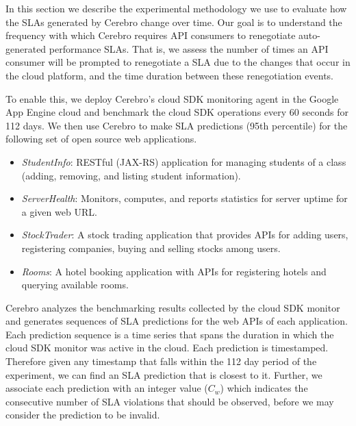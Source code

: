 In this section we describe the experimental methodology we use to evaluate how the SLAs
generated by Cerebro change over time. Our goal is to understand the frequency with
which Cerebro requires API consumers to renegotiate auto-generated performance SLAs. That is,
we assess the number of times an API consumer will be prompted to renegotiate a
SLA due to the changes that occur in the cloud platform, and the time duration
between these renegotiation events.

To enable this, we deploy Cerebro's cloud 
SDK monitoring agent in the Google App Engine cloud and benchmark
the cloud SDK operations every 60 seconds for 112 days. We then use Cerebro
to make SLA predictions (95th percentile) for the following set of open source web applications. 

\begin{itemize}
\vspace{-0.05in}
\item \textit{StudentInfo}: RESTful (JAX-RS) application for managing
students of a class (adding, removing, and listing student information).
\vspace{-0.05in}
\item \textit{ServerHealth}: Monitors, computes, and reports statistics for server
uptime for a given web URL.
\vspace{-0.05in}
\item \textit{StockTrader}: A stock trading application that
provides APIs for adding users, registering companies, buying and selling
stocks among users. 
\vspace{-0.05in}
\item \textit{Rooms}: A hotel booking application with APIs
for registering hotels and querying available rooms.
\vspace{-0.05in}
\end{itemize}

Cerebro analyzes the benchmarking results collected
by the cloud SDK monitor and generates sequences of SLA predictions for the web APIs of each
application. Each prediction sequence
is a time series that spans the duration in which the cloud SDK monitor was active
in the cloud. Each prediction is timestamped. Therefore given any timestamp that falls within the
112 day period of the experiment, we can find an SLA prediction that is closest to it. 
Further, we associate each prediction with an integer value ($C_{w}$) which indicates the consecutive 
number of SLA violations that should be
observed, before we may consider the prediction to be invalid. 

